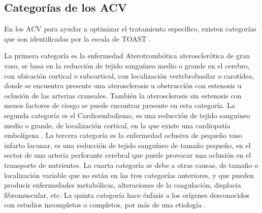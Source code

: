 \subsection{Categorías de los ACV}
\par En los ACV para ayudar a optimizar el tratamiento específico, existen categorías que son identificadas por la escala de TOAST \cite{Adams1993}.\\
\par La primera categoría es la enfermedad Aterotrombótica aterosclerótica de gran vaso, se basa en la reducción de tejido sanguíneo medio o grande en el cerebro, con ubicación cortical o subcortical, con localización vertebrobasilar o carotídea, donde se encuentra presente una aterosclerosis u obstrucción con estenosis u oclusión de las arterias craneales. También la aterosclerosis sin estenosis con menos factores de riesgo se puede encontrar presente en esta categoría. La segunda categoría es el Cardioembolismo, es una reducción de tejido sanguíneo medio o grande, de localización cortical, en la que existe una cardiopatía embolígena \cite{Molina2018}. La tercera categoría es la enfermedad oclusiva de pequeño vaso infarto lacunar, es una reducción de tejido sanguíneo de tamaño pequeño, en el sector de una arteria perforante cerebral que puede provocar una oclusión en el transporte de nutrientes. La cuarta categoría se debe a otras causas, de tamaño o localización variable que no están en las tres categorías anteriores, y que pueden producir enfermedades metabólicas, alteraciones de la coagulación, displacia fibromuscular, etc. La quinta categoría hace énfasis a los orígenes desconocidos con estudios incompletos o completos, por más de una etiología \cite{Radu2017}.\\


\doublespacing
